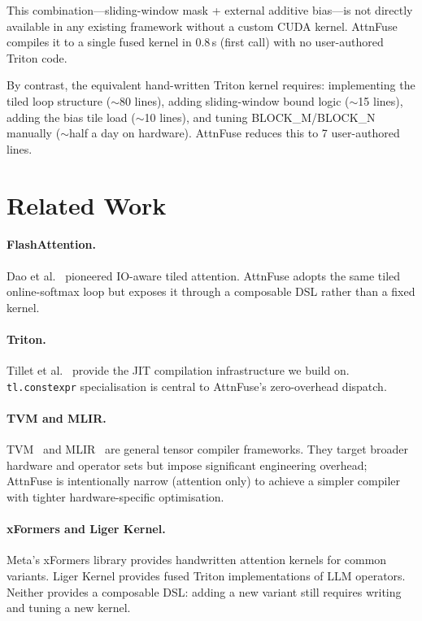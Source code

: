 \documentclass[10pt,twocolumn]{article}
\begin{document}
This combination---sliding-window mask + external additive bias---is not
directly available in any existing framework without a custom CUDA kernel.
AttnFuse compiles it to a single fused kernel in 0.8\,s (first call) with
no user-authored Triton code.

By contrast, the equivalent hand-written Triton kernel requires:
implementing the tiled loop structure ($\sim$80 lines), adding
sliding-window bound logic ($\sim$15 lines), adding the bias tile load
($\sim$10 lines), and tuning BLOCK\_M/BLOCK\_N manually ($\sim$half a day
on hardware).  AttnFuse reduces this to 7 user-authored lines.

\section{Related Work}

\paragraph{FlashAttention.}
Dao et al.~\cite{dao2022flashattention, dao2023flashattention2} pioneered
IO-aware tiled attention.  AttnFuse adopts the same tiled online-softmax
loop but exposes it through a composable DSL rather than a fixed kernel.

\paragraph{Triton.}
Tillet et al.~\cite{tillet2019triton} provide the JIT compilation
infrastructure we build on.  \texttt{tl.constexpr} specialisation is
central to AttnFuse's zero-overhead dispatch.

\paragraph{TVM and MLIR.}
TVM~\cite{chen2018tvm} and MLIR~\cite{lattner2021mlir} are general
tensor compiler frameworks.  They target broader hardware and operator
sets but impose significant engineering overhead; AttnFuse is intentionally
narrow (attention only) to achieve a simpler compiler with tighter
hardware-specific optimisation.

\paragraph{xFormers and Liger Kernel.}
Meta's xFormers library provides handwritten attention kernels for common
variants.  Liger Kernel provides fused Triton implementations of LLM
operators.  Neither provides a composable DSL: adding a new variant still
requires writing and tuning a new kernel.
\end{document}
